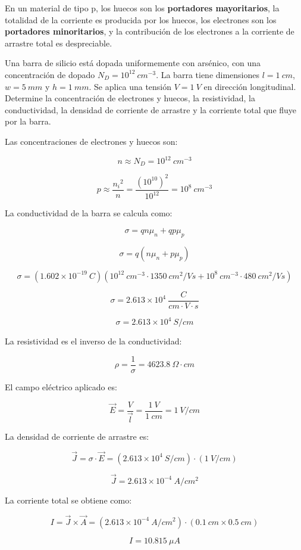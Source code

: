 En un material de tipo p, los huecos son los \textbf{portadores mayoritarios}, la totalidad de la corriente es producida por los huecos, los electrones son los \textbf{portadores minoritarios}, y la contribución de los electrones a la corriente de arrastre total es despreciable.

\begin{ejemplo}
Una barra de silicio está dopada uniformemente con arsénico, con una concentración de dopado $N_D=10^{12}\ cm^{-3}$. La barra tiene dimensiones $l=1\ cm$, $w=5\ mm$ y $h=1\ mm$. Se aplica una tensión $V=1\ V$ en dirección longitudinal. Determine la concentración de electrones y huecos, la resistividad, la conductividad, la densidad de corriente de arrastre y la corriente total que fluye por la barra.
\end{ejemplo}

\begin{solucion}
Las concentraciones de electrones y huecos son:

\[ n \approx N_D = 10^{12}\ cm^{-3} \]

\[ p \approx \dfrac{{n_i}^2}{n} = \dfrac{(10^{10})^2}{10^{12}} = 10^8\ cm^{-3} \]

La conductividad de la barra se calcula como:

\[ \sigma = q n \mu_n + q p \mu_p \]

\[ \sigma = q (n \mu_n + p \mu_p) \]

\[ \sigma = (1.602\times{}10^{-19}\ C) (10^{12}\ cm^{-3} \cdot 1350\ cm^2/Vs + 10^8\ cm^{-3} \cdot 480\ cm^2/Vs) \]

\[ \sigma = 2.613\times{}10^{4}\ \dfrac{C}{cm\cdot{}V\cdot{}s} \]

\[ \sigma = 2.613\times{}10^{4}\ S/cm \]

La resistividad es el inverso de la conductividad:

\[ \rho = \dfrac{1}{\sigma} = 4623.8\ \Omega \cdot cm \]

El campo eléctrico aplicado es:

\[ \vec{E} = \dfrac{V}{\vec{l}} = \dfrac{1\ V}{1\ cm} = 1\ V/cm \]

La densidad de corriente de arrastre es:

\[ \vec{J} = \sigma \cdot \vec{E} = (2.613\times{}10^4\ S/cm) \cdot (1\ V/cm) \]

\[ \vec{J} = 2.613\times{}10^{-4}\ A/cm^2 \]

La corriente total se obtiene como:

\[ I = \vec{J} \times{} \vec{A} = (2.613 \times 10^{-4}\ A/cm^2) \cdot{} (0.1\ cm \times 0.5\ cm) \]

\[ I = 10.815\ \mu A \]
\end{solucion}


